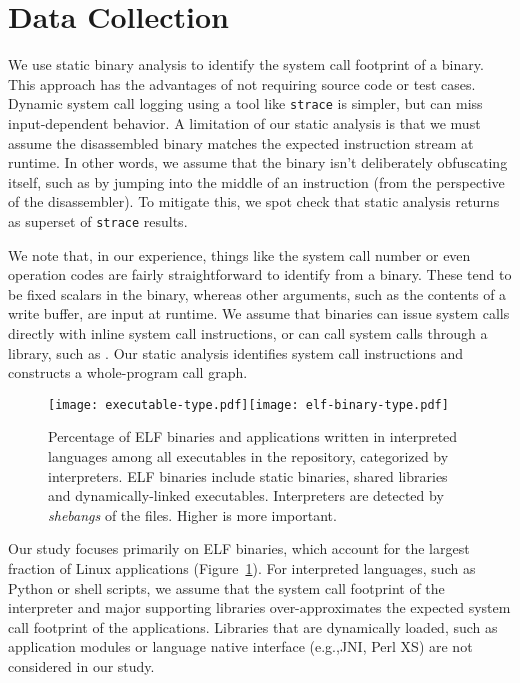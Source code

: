 \section{Data Collection}
\label{sec:measure:analysis}

We use static binary analysis to identify the system call footprint of a binary.  This approach has the advantages
of not requiring source code or test cases.  Dynamic system call logging using a tool like {\tt strace} is simpler,
but can miss input-dependent behavior.  A limitation of our static analysis is that we must assume the disassembled binary
matches the expected instruction stream at runtime.  In other words, we assume that the binary isn't deliberately obfuscating
itself, such as by jumping into the middle of an instruction (from the perspective of the disassembler).
To mitigate this, we spot check that static analysis returns as superset of {\tt strace} results.

We note that, in our experience, things like the system call number or even operation codes are fairly straightforward
to identify from a binary.  These tend to be fixed scalars in the binary, whereas other arguments, such as the contents of a write buffer,
are input at runtime.
We assume that binaries can issue system calls directly with inline system call instructions, or can call system calls through a library, such as \libc{}.
Our static analysis identifies system call instructions and constructs a whole-program call graph.

\begin{figure}[t!]
\centering
\texttt{[image: executable-type.pdf]}\texttt{[image: elf-binary-type.pdf]}
\vspace{-0.5in}
\footnotesize
\caption[Types of executables included in the study of Linux API usage.]
{Percentage of ELF binaries and applications written in interpreted languages among all executables in the \osdist{} repository, categorized by interpreters. ELF binaries include static binaries, shared libraries and dynamically-linked executables. Interpreters are detected by {\em shebangs} of the files. Higher is more important.}
\label{fig:syspop:executable-type}
\end{figure}

Our study focuses primarily on ELF binaries, which account for the largest fraction of Linux applications
(Figure~\ref{fig:syspop:executable-type}).
For interpreted languages, such as Python or shell scripts,
we assume that the system call footprint of the interpreter and major supporting libraries over-approximates the expected system call footprint of the applications.
Libraries that are dynamically loaded, such as application modules or
language native interface (e.g.,JNI, Perl XS) are not considered in our study. 

